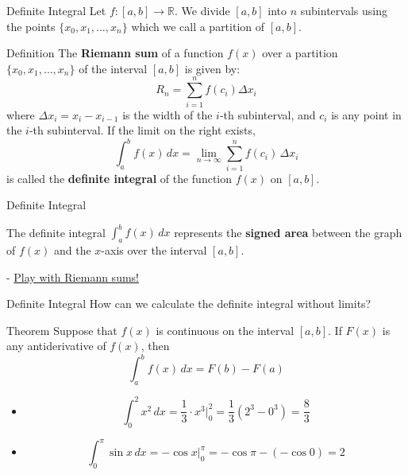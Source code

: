 \documentclass{beamer}
\newcommand{\R}{\mathbb{R}}
\begin{document}
\begin{frame}{Definite Integral}
Let $f:[a,b]\to\R$. We divide $[a,b]$ into $n$ subintervals using the points $\{x_0, x_1, \ldots, x_n\}$ which we call a partition of $[a,b]$.\pause
\begin{block}{Definition}
        The \textbf{Riemann sum} of a function $f(x)$ over a partition $\{x_0, x_1, \ldots, x_n\}$ of the interval $[a, b]$ is given by:
        \[
        R_n = \sum_{i=1}^{n} f(c_i) \Delta x_i
        \]
        where $\Delta x_i = x_i - x_{i-1}$ is the width of the $i$-th subinterval, and $c_i$ is any point in the $i$-th subinterval. \pause
         If the limit on the right exists, 
 \[\int_a^b f(x)\, dx = \lim_{n
            \to \infty} \sum_{i=1}^n f(c_i) \,\Delta x_i\]
            is called the \textbf{definite integral} of the function $f(x)$ on $[a,b]$.
            \end{block}
\end{frame}


\begin{frame}{Definite Integral}
 
    The definite integral $\int_a^b f(x) \, dx$ represents the \textbf{signed area} between the graph of $f(x)$ and the $x$-axis over the interval $[a, b]$.

      \begin{center}

    
    
  \end{center}

- \color{blue} \href{https://www.sfu.ca/math-coursenotes/Math\%20158\%20Course\%20Notes/sec_defint.html#:~:text=1.4.2\%20Defining\%20the\%20Definite\%20Integral}{Play with Riemann sums!}
\end{frame}



\begin{frame}{Definite Integral}
 How can we calculate the definite integral without limits?\pause
    \begin{block}{Theorem}
        Suppose that $f
(
x
)$
 is continuous on the interval 
$[
a
,
b
]$.
 If 
$F
(
x
)
$ is any antiderivative of 
$f
(
x
)
$,
 then
 \[\int_a^b f(x)\,dx = F(b)-F(a)\]
    \end{block}
\pause
\begin{example}
    \begin{itemize}%
        \item
        \[
\int_{0}^{2} x^2 \,dx =\frac{1}{3} \cdot  x^3 \bigg\vert_{0}^{2} = \frac{1}{3} (2^3 - 0^3) =\frac{8}{3}
\]
        \item %
       \[
\int_{0}^{\pi} \sin x \,dx =  -\cos x \bigg\vert_{0}^{\pi} = -\cos \pi - (-\cos0) = 2
\]

    \end{itemize}
\end{example}
\end{frame}
\end{document}
